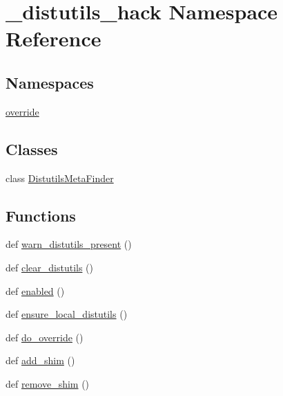 \hypertarget{namespace__distutils__hack}{}\section{\+\_\+distutils\+\_\+hack Namespace Reference}
\label{namespace__distutils__hack}
\subsection*{Namespaces}
\begin{DoxyCompactItemize}
\item 
 \hyperlink{namespace__distutils__hack_1_1override}{override}
\end{DoxyCompactItemize}
\subsection*{Classes}
\begin{DoxyCompactItemize}
\item 
class \hyperlink{class__distutils__hack_1_1DistutilsMetaFinder}{Distutils\+Meta\+Finder}
\end{DoxyCompactItemize}
\subsection*{Functions}
\begin{DoxyCompactItemize}
\item 
def \hyperlink{namespace__distutils__hack_a5da1217b890631529734c429b90eaadd}{warn\+\_\+distutils\+\_\+present} ()
\item 
def \hyperlink{namespace__distutils__hack_ac28df4321677f0863bfbb1e2b73c7002}{clear\+\_\+distutils} ()
\item 
def \hyperlink{namespace__distutils__hack_ab663f05918d0530087fdd91ff583aa39}{enabled} ()
\item 
def \hyperlink{namespace__distutils__hack_a65ef964befed1f319c1b0c7244caf027}{ensure\+\_\+local\+\_\+distutils} ()
\item 
def \hyperlink{namespace__distutils__hack_a4d3597db607bf8a6ccc19fa89f2746f6}{do\+\_\+override} ()
\item 
def \hyperlink{namespace__distutils__hack_a08c2f18dc39845f0f7198d0b68299660}{add\+\_\+shim} ()
\item 
def \hyperlink{namespace__distutils__hack_acb451667220b32f50838b9e69508212d}{remove\+\_\+shim} ()
\end{DoxyCompactItemize}
